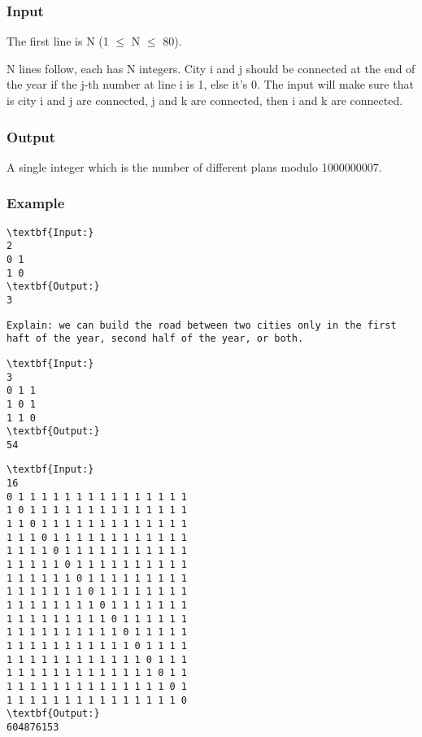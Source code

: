 \subsubsection{   Input  }

   The first line is N (1  $\le$  N  $\le$  80).  

   N lines follow, each has N integers. City i and j should be connected at the end of the year if the j-th number at line i is 1, else it's 0. The input will make sure that is city i and j are connected, j and k are connected, then i and k are connected.  

\subsubsection{   Output  }

   A single integer which is the number of different plans modulo 1000000007.  

\subsubsection{   Example  }
\begin{verbatim}
\textbf{Input:}
2
0 1
1 0
\textbf{Output:}
3\end{verbatim}
\begin{verbatim}
Explain: we can build the road between two cities only in the first haft of the year, second half of the year, or both.\end{verbatim}
\begin{verbatim}
\textbf{Input:}
3
0 1 1
1 0 1
1 1 0
\textbf{Output:}
54
\end{verbatim}
\begin{verbatim}
\textbf{Input:}
16
0 1 1 1 1 1 1 1 1 1 1 1 1 1 1 1
1 0 1 1 1 1 1 1 1 1 1 1 1 1 1 1
1 1 0 1 1 1 1 1 1 1 1 1 1 1 1 1
1 1 1 0 1 1 1 1 1 1 1 1 1 1 1 1
1 1 1 1 0 1 1 1 1 1 1 1 1 1 1 1
1 1 1 1 1 0 1 1 1 1 1 1 1 1 1 1
1 1 1 1 1 1 0 1 1 1 1 1 1 1 1 1
1 1 1 1 1 1 1 0 1 1 1 1 1 1 1 1
1 1 1 1 1 1 1 1 0 1 1 1 1 1 1 1
1 1 1 1 1 1 1 1 1 0 1 1 1 1 1 1
1 1 1 1 1 1 1 1 1 1 0 1 1 1 1 1
1 1 1 1 1 1 1 1 1 1 1 0 1 1 1 1
1 1 1 1 1 1 1 1 1 1 1 1 0 1 1 1
1 1 1 1 1 1 1 1 1 1 1 1 1 0 1 1
1 1 1 1 1 1 1 1 1 1 1 1 1 1 0 1
1 1 1 1 1 1 1 1 1 1 1 1 1 1 1 0
\textbf{Output:}
604876153\end{verbatim}
